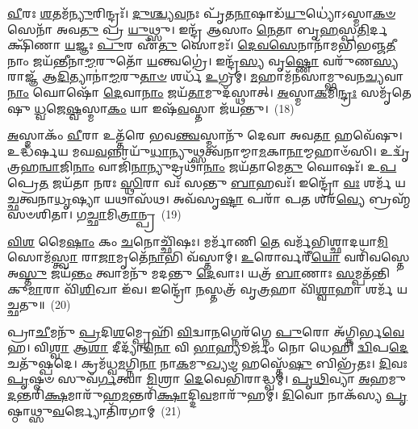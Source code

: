 \-\ul{𑌵𑍀}\-𑌰𑌃 \ul{𑌶}\-𑌤𑌮᳴\-\ul{𑌨𑍍𑌯𑍁}\-𑌰𑌿𑌨𑍍𑌦𑍍𑌰𑌃᳴। \ul{𑌦𑍁}\-\-\ul{𑌶𑍍𑌚𑍍𑌯}\-\-\ul{𑌵}\-𑌨𑌃 𑌪𑍃᳴𑌤\-\ul{𑌨𑌾}\-𑌷𑌾𑌡᳴\-\ul{𑌯𑍁}\-𑌧𑍍𑌯𑍋॑\-𑌽𑌸𑍍𑌮𑌾\-\ul{𑌕}\-\-\ul{𑍞} 𑌸𑍇𑌨𑌾᳴ 𑌅𑌵\-\ul{𑌤𑍁} 𑌪𑍍𑌰 \ul{𑌯𑍁}\-𑌥𑍍𑌸𑍁। 𑌇𑌨𑍍𑌦𑍍𑌰᳴ 𑌆𑌸𑌾𑌂 \ul{𑌨𑍇}\-𑌤𑌾 𑌬𑍃\-\ul{𑌹}\-𑌸𑍍𑌪\-\ul{𑌤𑌿}\-𑌰𑍍𑌦𑌕𑍍𑌷𑌿᳴𑌣𑌾 \ul{𑌯}\-𑌜𑍍𑌞𑌃 \ul{𑌪𑍁}\-𑌰 𑌏᳴\-\ul{𑌤𑍁} 𑌸𑍋𑌮𑌃᳴। \ul{𑌦𑍇}\-\-\ul{𑌵}\-\-\ul{𑌸𑍇}\-𑌨𑌾𑌨𑌾᳴𑌮𑌭𑌿𑌭𑌞𑍍𑌜\-\ul{𑌤𑍀}\-𑌨𑌾𑌂 𑌜𑌯᳴𑌨𑍍𑌤𑍀𑌨𑌾\-\ul{𑌮𑍍𑌮}\-𑌰𑍁𑌤𑍋᳴ \ul{𑌯}\-𑌨𑍍𑌤𑍍𑌵𑌗𑍍𑌰𑍇॑। 𑌇𑌨𑍍𑌦𑍍𑌰᳴\-\ul{𑌸𑍍𑌯} 𑌵𑍃\-\ul{𑌷𑍍𑌣𑍋} 𑌵𑌰𑍁᳴𑌣\-\ul{𑌸𑍍𑌯} 𑌰𑌾𑌜𑍍𑌞᳴ 𑌆\-\ul{𑌦𑌿}\-𑌤𑍍𑌯𑌾𑌨𑌾॑\-\ul{𑌮𑍍𑌮}\-𑌰𑍁\-\ul{𑌤𑌾}\-\-\ul{𑍞} 𑌶𑌰𑍍𑌧᳴ \ul{𑌉}\-𑌗𑍍𑌰𑌮𑍍। \ul{𑌮}\-𑌹𑌾𑌮᳴𑌨𑌸𑌾𑌮𑍍𑌭𑍁𑌵𑌨\-\ul{𑌚𑍍𑌯}\-𑌵𑌾\-\ul{𑌨𑌾𑌂} 𑌘𑍋𑌷𑍋᳴ \ul{𑌦𑍇}\-𑌵𑌾\-\ul{𑌨𑌾𑌂} 𑌜𑌯᳴\-\ul{𑌤𑌾}\-𑌮𑍁𑌦᳴𑌸𑍍𑌥𑌾𑌤𑍍। \ul{𑌅}\-𑌸𑍍𑌮𑌾\-\ul{𑌕}\-𑌮𑌿\-\ul{𑌨𑍍𑌦𑍍𑌰𑌃} 𑌸𑌮𑍃᳴𑌤𑍇𑌷𑍁 \ul{𑌧𑍍𑌵}\-𑌜𑍇\-\ul{𑌷𑍍𑌵}\-𑌸𑍍𑌮𑌾\-\ul{𑌕𑌂} 𑌯𑌾 𑌇𑌷᳴\-\ul{𑌵}\-𑌸𑍍𑌤𑌾 𑌜᳴𑌯𑌨𑍍𑌤𑍁।~(18)

\-\ul{𑌅}\-𑌸𑍍𑌮𑌾𑌕𑌂᳴ \ul{𑌵𑍀}\-𑌰𑌾 𑌉𑌤𑍍𑌤᳴𑌰𑍇 𑌭𑌵\-\ul{𑌨𑍍𑌤𑍍𑌵}\-𑌸𑍍𑌮𑌾𑌨𑍁᳴ 𑌦𑍇𑌵𑌾 𑌅𑌵\-\ul{𑌤𑌾} 𑌹𑌵𑍇᳴𑌷𑍁। 𑌉𑌦𑍍𑌧᳴𑌰𑍍\mbox{}𑌷𑌯 𑌮𑌘\-\ul{𑌵}\-𑌨𑍍𑌨𑌾𑌯𑍁᳴\-\ul{𑌧𑌾}\-𑌨𑍍𑌯𑍁𑌥𑍍𑌸𑌤𑍍𑌵᳴𑌨𑌾𑌮𑍍𑌮𑌾\-\ul{𑌮}\-𑌕𑌾\-\ul{𑌨𑌾}\-𑌮𑍍𑌮𑌹𑌾𑍞᳴𑌸𑌿। 𑌉𑌦𑍍𑌵𑍃᳴𑌤𑍍𑌰𑌹\-\ul{𑌨𑍍𑌵𑌾}\-𑌜𑌿\-\ul{𑌨𑌾𑌂} 𑌵𑌾𑌜𑌿᳴\-\ul{𑌨𑌾}\-𑌨𑍍𑌯𑍁𑌦𑍍𑌰𑌥𑌾᳴\-\ul{𑌨𑌾𑌂} 𑌜𑌯᳴𑌤𑌾𑌮𑍇\-\ul{𑌤𑍁} 𑌘𑍋𑌷𑌃᳴। 𑌉\-\ul{𑌪} 𑌪𑍍𑌰𑍇\-\ul{𑌤} 𑌜𑌯᳴𑌤𑌾 𑌨𑌰𑌃 \ul{𑌸𑍍𑌥𑌿}\-𑌰𑌾 𑌵𑌃᳴ 𑌸𑌨𑍍𑌤𑍁 \ul{𑌬𑌾}\-𑌹𑌵𑌃᳴। 𑌇𑌨𑍍𑌦𑍍𑌰𑍋᳴ \ul{𑌵𑌃} 𑌶𑌰𑍍𑌮᳴ 𑌯𑌚𑍍𑌛𑌤𑍍𑌵𑌨𑌾\-\ul{𑌧𑍃}\-𑌷𑍍𑌯𑌾 𑌯𑌥𑌾𑌸᳴𑌥। 𑌅𑌵᳴𑌸𑍃\-\ul{𑌷𑍍𑌟𑌾} 𑌪𑌰𑌾᳴ 𑌪\-\ul{𑌤} 𑌶𑌰᳴\-\ul{𑌵𑍍𑌯𑍇} 𑌬𑍍𑌰𑌹𑍍𑌮᳴𑌸𑍞𑌶𑌿𑌤𑌾। 𑌗\-\ul{𑌚𑍍𑌛𑌾}\-𑌮𑌿\-\ul{𑌤𑍍𑌰𑌾}\-𑌨𑍍𑌪𑍍𑌰~(19)

\-\ul{𑌵𑌿}\-\-\ul{𑌶} 𑌮𑍈\-\ul{𑌷𑌾𑌂} 𑌕𑌂 \ul{𑌚}\-𑌨𑍋𑌚𑍍𑌛𑌿᳴𑌷𑌃। 𑌮𑌰𑍍𑌮𑌾᳴𑌣𑌿 \ul{𑌤𑍇} 𑌵𑌰𑍍𑌮᳴𑌭𑌿𑌶𑍍𑌛𑌾𑌦𑌯𑌾\-\ul{𑌮𑌿} 𑌸𑍋𑌮᳴\-\ul{𑌸𑍍𑌤𑍍𑌵𑌾} 𑌰𑌾\-\ul{𑌜𑌾}\-𑌮𑍃𑌤𑍇᳴\-\ul{𑌨𑌾}\-𑌭𑌿 𑌵᳴𑌸𑍍𑌤𑌾𑌮𑍍। \ul{𑌉}\-𑌰𑍋𑌰𑍍𑌵𑌰𑍀᳴\-\ul{𑌯𑍋} 𑌵𑌰𑌿᳴𑌵𑌸𑍍𑌤𑍇 𑌅\-\ul{𑌸𑍍𑌤𑍁} 𑌜𑌯᳴\-\ul{𑌨𑍍𑌤𑌂} 𑌤𑍍𑌵𑌾𑌮𑌨𑍁᳴ 𑌮𑌦𑌨𑍍𑌤𑍁 \ul{𑌦𑍇}\-𑌵𑌾𑌃। 𑌯𑌤𑍍𑌰᳴ \ul{𑌬𑌾}\-𑌣𑌾𑌃 \ul{𑌸}\-𑌮𑍍𑌪𑌤᳴𑌨𑍍𑌤𑌿 𑌕𑍁\-\ul{𑌮𑌾}\-𑌰𑌾 𑌵𑌿᳴\-\ul{𑌶𑌿}\-𑌖𑌾 𑌇᳴𑌵। 𑌇𑌨𑍍𑌦𑍍𑌰𑍋᳴ \ul{𑌨}\-𑌸𑍍𑌤𑌤𑍍𑌰᳴ 𑌵𑍃\-\ul{𑌤𑍍𑌰}\-𑌹𑌾 𑌵𑌿᳴\-\ul{𑌶𑍍𑌵𑌾}\-𑌹𑌾 𑌶𑌰𑍍𑌮᳴ 𑌯𑌚𑍍𑌛𑌤𑍁॥~(20)

{\anuvakamend[{\-\ul{𑌦𑍀}\-\-\ul{𑌯𑌾} \ul{𑌦𑌾}\-𑌯𑍋 𑌜᳴𑌯\-\ul{𑌨𑍍𑌤𑍍𑌵}\-𑌮𑌿\-\ul{𑌤𑍍𑌰𑌾}\-𑌨𑍍𑌪𑍍𑌰 𑌚᳴𑌤𑍍𑌵𑌾\-\ul{𑌰𑌿}\-\-\ul{𑍞}\-𑌶𑌚𑍍𑌚᳴}]}%

𑌪𑍍𑌰𑌾\-\ul{𑌚𑍀}\-𑌮𑌨𑍁᳴ \ul{𑌪𑍍𑌰}\-𑌦𑌿\-\ul{𑌶}\-𑌮𑍍𑌪𑍍𑌰𑍇𑌹𑌿᳴ \ul{𑌵𑌿}\-𑌦𑍍𑌵𑌾\-\ul{𑌨}\-𑌗𑍍𑌨𑍇𑌰᳴𑌗𑍍𑌨𑍇 \ul{𑌪𑍁}\-𑌰𑍋 𑌅᳴𑌗𑍍𑌨𑌿𑌰𑍍𑌭\-\ul{𑌵𑍇}\-𑌹। 𑌵𑌿\-\ul{𑌶𑍍𑌵𑌾} 𑌆\-\ul{𑌶𑌾} 𑌦𑍀𑌦𑍍𑌯𑌾᳴\-\ul{𑌨𑍋} 𑌵𑌿 \ul{𑌭𑌾}\-𑌹𑍍𑌯𑍂𑌰𑍍𑌜𑌂᳴ 𑌨𑍋 𑌧𑍇𑌹𑌿 \ul{𑌦𑍍𑌵𑌿}\-𑌪\-\ul{𑌦𑍇} 𑌚𑌤𑍁᳴𑌷𑍍𑌪𑌦𑍇। 𑌕𑍍𑌰𑌮᳴𑌧𑍍𑌵\-\ul{𑌮}\-𑌗𑍍𑌨𑌿\-\ul{𑌨𑌾} 𑌨𑌾\-\ul{𑌕}\-𑌮𑍁\-\ul{𑌖𑍍𑌯}\-\-\ul{𑍞} 𑌹𑌸𑍍𑌤𑍇᳴\-\ul{𑌷𑍁} 𑌬𑌿𑌭𑍍𑌰᳴𑌤𑌃। \ul{𑌦𑌿}\-𑌵𑌃 \ul{𑌪𑍃}\-𑌷𑍍𑌠𑍞 𑌸𑍁𑌵᳴\-\ul{𑌰𑍍𑌗}\-𑌤𑍍𑌵𑌾 \ul{𑌮𑌿}\-𑌶𑍍𑌰𑌾 \ul{𑌦𑍇}\-𑌵𑍇𑌭𑌿᳴𑌰𑌾𑌦𑍍𑌧𑍍𑌵𑌮𑍍। \ul{𑌪𑍃}\-\-\ul{𑌥𑌿}\-𑌵𑍍𑌯𑌾 \ul{𑌅}\-𑌹𑌮𑍁\-\ul{𑌦}\-𑌨𑍍𑌤𑌰𑌿᳴\-\ul{𑌕𑍍𑌷}\-𑌮𑌾𑌰𑍁᳴𑌹\-\ul{𑌮}\-𑌨𑍍𑌤𑌰𑌿᳴\-\ul{𑌕𑍍𑌷𑌾}\-𑌦𑍍𑌦𑌿\-\ul{𑌵}\-𑌮𑌾𑌰𑍁᳴𑌹𑌮𑍍। \ul{𑌦𑌿}\-𑌵𑍋 𑌨𑌾𑌕᳴𑌸𑍍𑌯 \ul{𑌪𑍃}\-𑌷𑍍𑌠𑌾𑌥𑍍𑌸𑍁\-\ul{𑌵}\-𑌰𑍍𑌜𑍍𑌯𑍋𑌤𑌿᳴𑌰𑌗𑌾𑌮𑍍~(21)

